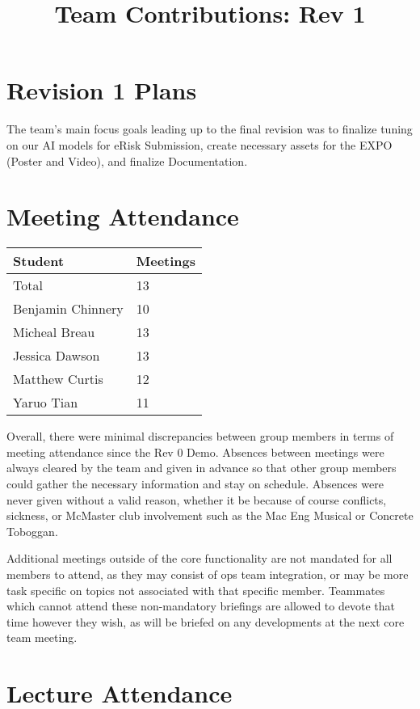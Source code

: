 \documentclass{article}
\title{Team Contributions: Rev 1\\\progname}
\author{\authname}
\date{}
\begin{document}
\maketitle

\section{Revision 1 Plans}

The team's main focus goals leading up to the final revision was to finalize tuning on our AI models for eRisk Submission, create necessary assets for the EXPO (Poster and Video), and finalize Documentation.

\section{Meeting Attendance}

\begin{table}[H]
\centering
\begin{tabular}{ll}
\toprule
\textbf{Student} & \textbf{Meetings}\\
\midrule
Total & 13\\
Benjamin Chinnery & 10\\
Micheal Breau & 13\\
Jessica Dawson & 13\\
Matthew Curtis & 12\\
Yaruo Tian & 11\\
\bottomrule
\end{tabular}
\end{table}
Overall, there were minimal discrepancies between group members in terms of meeting attendance since the Rev 0 Demo. Absences between meetings were always cleared by the team and given in advance so that other group members could gather the necessary information and stay on schedule. Absences were never given without a valid reason, whether it be because of course conflicts, sickness, or McMaster club involvement such as the Mac Eng Musical or Concrete Toboggan.

Additional meetings outside of the core functionality are not mandated for all members to attend, as they may consist of ops team integration, or may be more task specific on topics not associated with that specific member. Teammates which cannot attend these non-mandatory briefings are allowed to devote that time however they wish, as will be briefed on any developments at the next core team meeting.


\section{Lecture Attendance}
\end{document}
